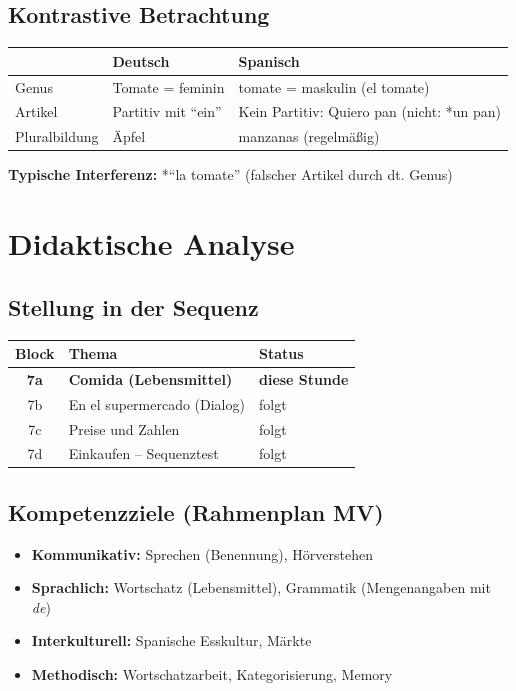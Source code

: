 \documentclass[11pt,a4paper]{article}
\begin{document}
\subsection{Kontrastive Betrachtung}

\begin{tabular}{|l|p{5cm}|p{5cm}|}
\hline
& \textbf{Deutsch} & \textbf{Spanisch} \\
\hline
Genus & Tomate = feminin & tomate = maskulin (el tomate) \\
\hline
Artikel & Partitiv mit ``ein'' & Kein Partitiv: Quiero pan (nicht: *un pan) \\
\hline
Pluralbildung & Äpfel & manzanas (regelmäßig) \\
\hline
\end{tabular}

\textbf{Typische Interferenz:} *``la tomate'' (falscher Artikel durch dt. Genus)

\section{Didaktische Analyse}

\subsection{Stellung in der Sequenz}
\begin{tabular}{|c|l|l|}
\hline
\textbf{Block} & \textbf{Thema} & \textbf{Status} \\
\hline
\textbf{7a} & \textbf{Comida (Lebensmittel)} & \textbf{diese Stunde} \\
7b & En el supermercado (Dialog) & folgt \\
7c & Preise und Zahlen & folgt \\
7d & Einkaufen -- Sequenztest & folgt \\
\hline
\end{tabular}

\subsection{Kompetenzziele (Rahmenplan MV)}
\begin{itemize}
    \item \textbf{Kommunikativ:} Sprechen (Benennung), Hörverstehen
    \item \textbf{Sprachlich:} Wortschatz (Lebensmittel), Grammatik (Mengenangaben mit \textit{de})
    \item \textbf{Interkulturell:} Spanische Esskultur, Märkte
    \item \textbf{Methodisch:} Wortschatzarbeit, Kategorisierung, Memory
\end{itemize}
\end{document}
